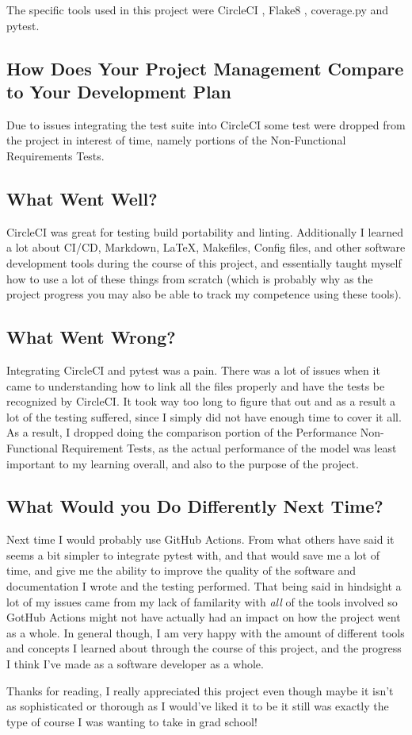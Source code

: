 \documentclass{article}
\begin{document}
The specific tools used in this project were CircleCI \cite{CircleCI}, Flake8 \cite{Flake8}, coverage.py
and pytest.

\subsection{How Does Your Project Management Compare to Your Development Plan}

Due to issues integrating the test suite into CircleCI some test were dropped from the project in interest of time, namely
portions of the Non-Functional Requirements Tests.

\subsection{What Went Well?}

CircleCI was great for testing build portability and linting. Additionally I learned a lot about CI/CD, Markdown, LaTeX, Makefiles, Config files,
and other software development tools during the course of this project, and essentially taught myself how to use a lot of these things
from scratch (which is probably why as the project progress you may also be able to track my competence using these tools).

\subsection{What Went Wrong?}

Integrating CircleCI and pytest was a pain. There was a lot of issues when it came to understanding how to link all the files properly and
have the tests be recognized by CircleCI. It took way too long to figure that out and as a result a lot of the testing suffered, since I simply
did not have enough time to cover it all. As a result, I dropped doing the comparison portion of the Performance Non-Functional Requirement Tests, as the actual
performance of the model was least important to my learning overall, and also to the purpose of the project.

\subsection{What Would you Do Differently Next Time?}

Next time I would probably use GitHub Actions. From what others have said it seems a bit simpler to integrate pytest with, and that would save me a 
lot of time, and give me the ability to improve the quality of the software and documentation I wrote and the testing performed. That being said
in hindsight a lot of my issues came from my lack of familarity with \textit{all} of the tools involved so GotHub Actions might not have
actually had an impact on how the project went as a whole. In general though, I am very happy with the amount of different tools and concepts
I learned about through the course of this project, and the progress I think I've made as a software developer as a whole.

Thanks for reading, I really appreciated this project even though maybe it isn't as sophisticated or thorough as I would've liked it to be
it still was exactly the type of course I was wanting to take in grad school!
\end{document}
